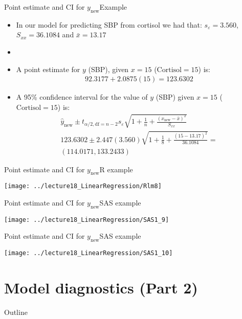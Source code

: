 \documentclass[xcolor=dvipsnames]{beamer}
\begin{document}
\begin{frame}{Point estimate and CI for $y_{\text{new}}$}{Example}
\begin{itemize}
\item In our model for predicting SBP from cortisol we had that: $s_{\varepsilon} = 3.560$, $S_{xx} = 36.1084$ and $\bar{x}=13.17$ \pause
\item[]
\item A point estimate for $y$ (SBP), given $x=15$ ($\text{Cortisol}=15$) is: \pause
\begin{gather*}
92.3177 + 2.0875(15) = 123.6302
\end{gather*} \pause
\item A 95\% confidence interval for the value of $y$ (SBP) given $x=15$ ($\text{Cortisol}=15$) is: \pause
	\begin{gather*}
	\hat{y}_{\text{new}} \pm t_{\alpha / 2, \text{df} = n-2}s_{\varepsilon}\sqrt{1+\frac{1}{n} + \frac{(x_{\text{new}}-\bar{x})^2}{S_{xx}}} \\
	123.6302 \pm 2.447 (3.560)\sqrt{1+ \frac{1}{8} + \frac{(15-13.17)^2}{36.1084}} = \\
	(114.0171, 133.2433)
	\end{gather*}
\end{itemize}
\end{frame}

\begin{frame}{Point estimate and CI for $y_{\text{new}}$}{R example}
	\begin{center}
		\texttt{[image: ../lecture18\_LinearRegression/Rlm8]}
	\end{center}
\end{frame}

\begin{frame}{Point estimate and CI for $y_{\text{new}}$}{SAS example}
	\begin{center}
		\texttt{[image: ../lecture18\_LinearRegression/SAS1\_9]}
	\end{center}
\end{frame}

\begin{frame}{Point estimate and CI for $y_{\text{new}}$}{SAS example}
	\begin{center}
		\texttt{[image: ../lecture18\_LinearRegression/SAS1\_10]}
	\end{center}
\end{frame}


\section{Model diagnostics (Part 2)}
\begin{frame}{Outline}
\tableofcontents[currentsection,subsectionstyle=show/shaded/hide]
\end{frame}
\end{document}
